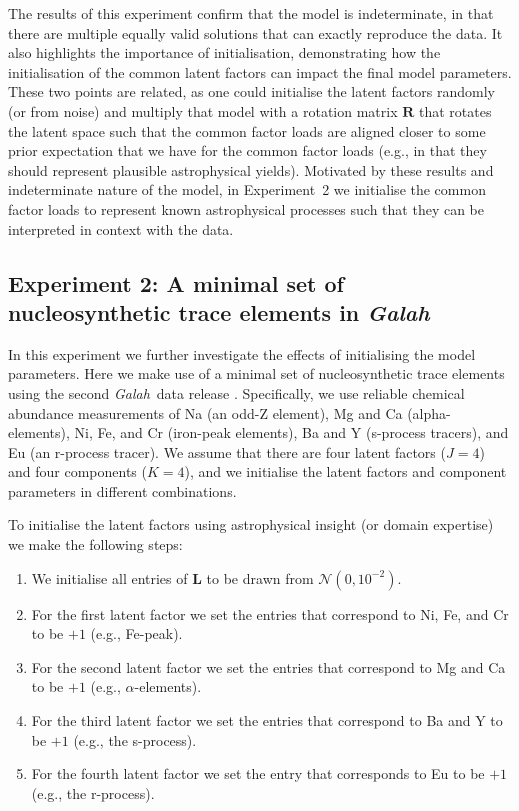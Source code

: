 \documentclass[twocolumn]{aastex61}
\newcommand{\project}[1]{\textsl{#1}}
\newcommand{\Galah}{\project{Galah}}
\newcommand{\factorloads}{\textbf{L}}
\begin{document}
The results of this experiment confirm that the model is indeterminate, in 
that there are multiple equally valid solutions that can exactly reproduce
the data. It also highlights the importance of initialisation, demonstrating
how the initialisation of the common latent factors can impact the final
model parameters. These two points are related, as one could initialise the
latent factors randomly (or from noise) and multiply that model with a
rotation matrix $\mathbf{R}$ that rotates the latent space such that the
common factor loads are aligned closer to some prior expectation that we have
for the common factor loads (e.g., in that they should represent plausible
astrophysical yields). Motivated by these results and indeterminate nature
of the model, in Experiment~2 we initialise the common factor loads
to represent known astrophysical processes such that they can be interpreted
in context with the data.


\subsection{Experiment 2: A minimal set of nucleosynthetic trace elements in \Galah}

In this experiment we further investigate the effects of initialising the model parameters.
Here we make use of a minimal set of nucleosynthetic trace elements
using the second \Galah\ data release \citep{Buder:2018}. Specifically, we use
reliable chemical abundance measurements of Na (an odd-Z element), Mg and Ca (alpha-elements),
Ni, Fe, and Cr (iron-peak elements), Ba and Y (s-process tracers), and Eu (an r-process tracer).
We assume that there are four latent factors ($J = 4$) and four components ($K = 4$),
and we initialise the latent factors and component parameters in different combinations.

To initialise the latent factors using astrophysical insight (or domain expertise)
we make the following steps:
\begin{enumerate}
	\item We initialise all entries of $\factorloads$ to be drawn from $\mathcal{N}\left(0, 10^{-2}\right)$.
	\item For the first latent factor we set the entries that correspond to Ni, Fe, and Cr to be $+1$ (e.g., Fe-peak).
	\item For the second latent factor we set the entries that correspond to Mg and Ca to be $+1$ (e.g., $\alpha$-elements).
	\item For the third latent factor we set the entries that correspond to Ba and Y to be $+1$ (e.g., the s-process).
	\item For the fourth latent factor we set the entry that corresponds to Eu to be $+1$ (e.g., the r-process).
\end{enumerate}
\end{document}

